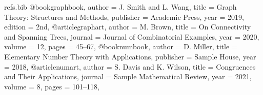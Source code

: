 
\begin{filecontents*}[overwrite]{refs.bib}
	@book{graphbook,
		author    = {J. Smith and L. Wang},
		title     = {Graph Theory: Structures and Methods},
		publisher = {Academic Press},
		year      = {2019},
		edition   = {2nd},
	}
	@article{graphart,
		author  = {M. Brown},
		title   = {On Connectivity and Spanning Trees},
		journal = {Journal of Combinatorial Examples},
		year    = {2020},
		volume  = {12},
		pages   = {45--67},
	}
	@book{numbook,
		author    = {D. Miller},
		title     = {Elementary Number Theory with Applications},
		publisher = {Sample House},
		year      = {2018},
	}
	@article{numart,
		author  = {S. Davis and K. Wilson},
		title   = {Congruences and Their Applications},
		journal = {Sample Mathematical Review},
		year    = {2021},
		volume  = {8},
		pages   = {101--118},
	}
\end{filecontents*}

\RequirePackage{iftex}
\ifXeTeX
\else
{}
\stop
\fi


\newcommand{\LectureClass}{book}
\newcommand{\LectureClassOptions}{openany}   %

